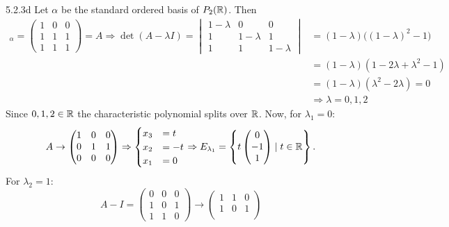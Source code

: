 \documentclass{exam}
\begin{document}
  \begin{problem}{5.2.3d}
    Let $\alpha$ be the standard ordered basis of $P_2(\mathbb R)$. Then 
    \begin{align*}
      [T]_\alpha = \begin{pmatrix}
        1 & 0 & 0 \\
        1 & 1 & 1 \\
        1 & 1 & 1
      \end{pmatrix} = A
      \Rightarrow \det(A - \lambda I) = \begin{vmatrix}
        1 - \lambda & 0 & 0 \\
        1 & 1 - \lambda & 1 \\
        1 & 1 & 1 - \lambda
      \end{vmatrix}
      &= (1 - \lambda)\Big((1 - \lambda)^2 - 1\Big) \\
      &= (1 - \lambda)(1 - 2\lambda + \lambda^2 - 1) \\
      &= (1 - \lambda)(\lambda^2 - 2\lambda) = 0 \\
      &\Rightarrow \lambda = 0, 1, 2
    \end{align*}
    Since $0, 1, 2 \in \mathbb R$ the characteristic polynomial splits over $\mathbb R$. Now, for $\lambda_1 = 0$: 
    \[
      A \to \begin{pmatrix}
        1 & 0 & 0 \\
        0 & 1 & 1 \\
        0 & 0 & 0
      \end{pmatrix}
      \Rightarrow \begin{cases}
        x_3 &= t \\
        x_2 &= -t \\
        x_1 &= 0 
      \end{cases}
      \Rightarrow E_{\lambda_{1}} = \left\{
        t\begin{pmatrix}
          0 \\ -1 \\ 1
        \end{pmatrix}
        \mid t \in \mathbb R
       \right\}.
    \]
    For $\lambda_2 = 1$:
    \[
        A - I = \begin{pmatrix}
          0 & 0 & 0 \\
          1 & 0 & 1 \\
          1 & 1 & 0 
        \end{pmatrix}
        \to \begin{pmatrix}
          1 & 1 & 0 \\
          1 & 0 & 1 \\

\end{pmatrix}\]
\end{problem}
\end{document}
